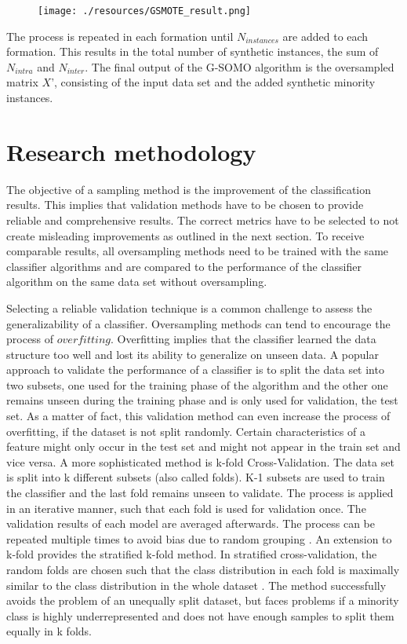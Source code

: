 \documentclass[parskip=full]{scrartcl}
\begin{document}
\begin{figure}[H]
	\centering
	\texttt{[image: ./resources/GSMOTE\_result.png]}
	\label{fig:GeometricConstruction}
\end{figure}

The process is repeated in each formation until $N_{instances}$ are added to each formation. This results 
in the total number of synthetic instances, the sum of $N_{intra}$ and $N_{inter}$. The final output of 
the G-SOMO algorithm is the oversampled matrix $X$', consisting of the input data set and the added 
synthetic minority instances.

\section{Research methodology}

The objective of a sampling method is the improvement of the classification results. This implies that 
validation methods have to be chosen to provide reliable and comprehensive results. The correct metrics 
have to be selected to not create misleading improvements as outlined in the next section. To receive 
comparable results, all oversampling methods need to be trained with the same classifier algorithms 
and are compared to the performance of the classifier algorithm on the same data set without oversampling.

Selecting a reliable validation technique is a common challenge to assess the generalizability 
of a classifier. Oversampling methods can tend to encourage the process of $overfitting$. Overfitting 
implies that the classifier learned the data structure too well and lost its ability to generalize on 
unseen data. A popular approach to validate the performance of a classifier is to split the data set 
into two subsets, one used for the training phase of the algorithm and the other one remains unseen 
during the training phase and is only used for validation, the test set. As a matter of fact, this 
validation method can even increase the process of overfitting, if the dataset is not split randomly. 
Certain characteristics of a feature might only occur in the test set and might not appear in the 
train set and vice versa. A more sophisticated method is k-fold Cross-Validation. The data set is split 
into k different subsets (also called folds). K-1 subsets are used to train the classifier and the 
last fold remains unseen to validate. The process is applied in an iterative manner, such that each fold 
is used for validation once. The validation results of each model are averaged afterwards. The process 
can be repeated multiple times to avoid bias due to random grouping \cite{Japkowicz2013}. An extension 
to k-fold provides the stratified k-fold method. In stratified cross-validation, the random folds are 
chosen such that the class distribution in each fold is maximally similar to the class distribution in 
the whole dataset \cite{Vanwinckelen2015}. The method successfully avoids the problem of an unequally 
split dataset, but faces problems if a minority class is highly underrepresented and does not have 
enough samples to split them equally in k folds.
\end{document}
